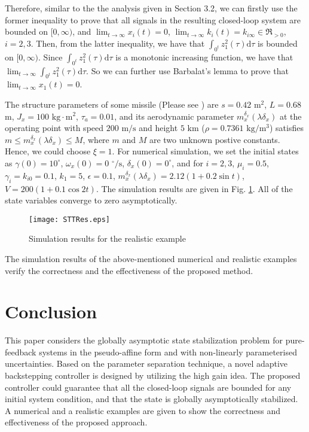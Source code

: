 \documentclass{tSYS2e}
\theoremstyle{plain}
\theoremstyle{definition}
\begin{document}
Therefore, similar to the the analysis given in Section 3.2, we can firstly use the former inequality to prove that
all signals in the resulting closed-loop system are bounded on $[0,\infty )$, and
$\lim_{t\rightarrow \infty }x_i(t)=0$, $\lim_{t\rightarrow \infty }k_{i}(t)=
k_{i\infty}\in \Re _{>0}$, $i=2,3$. Then, from the latter inequality, we have that
$\int_{0}\nolimits^{t}z_{1}^{2}(\tau )\mathrm{d}\tau$ is bounded on $[0,\infty )$. Since
$\int_{0}\nolimits^{t}z_{1}^{2}(\tau )\mathrm{d}\tau$ is a monotonic increasing function,
we have that $\lim_{t\rightarrow\infty}\int_{0}\nolimits^{t}z_{1}^{2}(\tau )\mathrm{d}\tau$.
So we can further use Barbalat's lemma to prove that $\lim_{t\rightarrow \infty }x_1(t)=0$.


The structure parameters of some missile (Please see \cite{Hou2013}) are $s=0.42$ $\mathrm{m}^{2}$, $L=0.68$
$\mathrm{m}$, $J_{x}=100$ $\mathrm{kg}\cdot \mathrm{m}^{2}$, $\tau_a=0.01$, and its aerodynamic
parameter $m_{x}^{\delta _{x}}(\lambda \delta _{x})$ at the operating point
with speed $200$ $\mathrm{m}/\mathrm{s}$ and height $5$ $\mathrm{km}$ ($\rho =0.7361$
$\mathrm{kg}/\mathrm{m}^{3}$) satisfies $m\leq m_{x}^{\delta _{x}}(\lambda \delta
_{x})\leq M$, where $m$ and $M$ are two unknown postive constants. Hence, we could choose $\xi=1$. For
numerical simulation, we set the initial states as $\gamma (0)=10^{\circ }$,
$\omega _{x}(0)=0$ $^{\circ}/\mathrm{s}$, $\delta _{x}(0)=0^{\circ}$, and
for $i=2,3$, $\mu_i=0.5$, $\gamma_i=k_{i0}=0.1$, $k_1=5$, $\epsilon=0.1$,
$m_{x}^{\delta _{x}}(\lambda \delta _{x})=2.12(1+0.2\sin t)$, $V=200(1+0.1\cos 2t)$.
The simulation results are
given in  Fig. \ref{fig2}. All of the state variables converge to zero asymptotically.

\begin{figure}[!htb]
  \centering
  \texttt{[image: STTRes.eps]}
  \caption{Simulation results for the realistic example}
  \label{fig2}
\end{figure}

The simulation results of the above-mentioned numerical and realistic examples verify the correctness and the effectiveness of the proposed method.


\section{Conclusion}
This paper considers the globally asymptotic state stabilization problem for
pure-feedback systems in the pseudo-affine form and with non-linearly parameterised uncertainties.
Based on the parameter separation technique, a novel adaptive backstepping controller is designed
by utilizing the high gain idea. The proposed controller could guarantee that
all the closed-loop signals are bounded for any initial system condition, and that the state is globally asymptotically stabilized.
A numerical and a realistic examples are given to show the correctness and effectiveness of the proposed approach.
\end{document}
